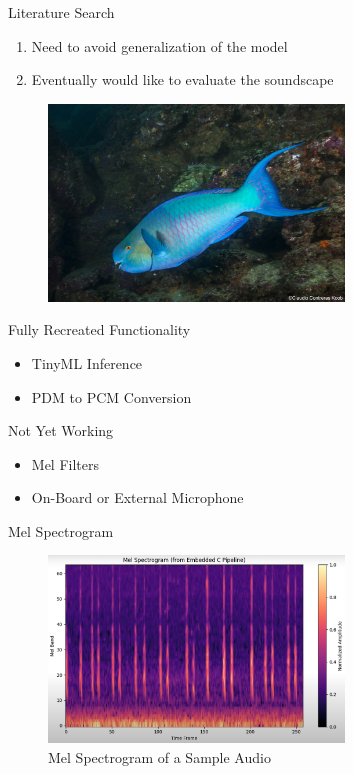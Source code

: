 \begin{frame}{Literature Search}
    \begin{enumerate}
        \item Need to avoid generalization of the model
        \item Eventually would like to evaluate the soundscape
    \end{enumerate}
    \begin{figure}
        \centering
        \includegraphics[height=0.7\textheight,width=0.7\textwidth,keepaspectratio]{images/aid_4.jpg}
    \end{figure}
\end{frame}

\begin{frame}{Fully Recreated Functionality}
    \begin{itemize}
        \item TinyML Inference
        \item PDM to PCM Conversion
    \end{itemize}    
\end{frame}

\begin{frame}{Not Yet Working}
    \begin{itemize}
        \item Mel Filters
        \item On-Board or External Microphone
    \end{itemize}    
\end{frame}

\begin{frame}{Mel Spectrogram}\begin{figure}[t]
    \centering
    \includegraphics[height=0.7\textheight,width=0.7\textwidth,keepaspectratio]{mel_spectogram.png}
    \caption{Mel Spectrogram of a Sample Audio}\end{figure}
\end{frame}

